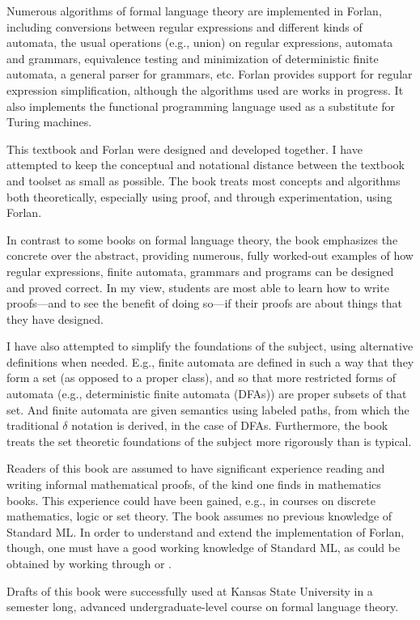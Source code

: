 Numerous algorithms of formal language theory are implemented in
Forlan, including conversions between regular expressions and
different kinds of automata, the usual operations (e.g., union) on
regular expressions, automata and grammars, equivalence testing and
minimization of deterministic finite automata, a general parser for
grammars, etc.  Forlan provides support for regular expression
simplification, although the algorithms used are works in progress.
It also implements the functional programming language used as a
substitute for Turing machines.

This textbook and Forlan were designed and developed together.  I have
attempted to keep the conceptual and notational distance between the
textbook and toolset as small as possible.  The book treats most
concepts and algorithms both theoretically, especially using proof,
and through experimentation, using Forlan.

In contrast to some books on formal language theory, the book
emphasizes the concrete over the abstract, providing numerous, fully
worked-out examples of how regular expressions, finite automata,
grammars and programs can be designed and proved correct.  In my view,
students are most able to learn how to write proofs---and to see the
benefit of doing so---if their proofs are about things that they have
designed.

I have also attempted to simplify the foundations of the subject,
using alternative definitions when needed. E.g., finite automata are
defined in such a way that they form a set (as opposed to a proper
class), and so that more restricted forms of automata (e.g.,
deterministic finite automata (DFAs)) are proper subsets of that
set. And finite automata are given semantics using labeled paths, from
which the traditional $\delta$ notation is derived, in the case of
DFAs. Furthermore, the book treats the set theoretic foundations of
the subject more rigorously than is typical.

Readers of this book are assumed to have significant experience
reading and writing informal mathematical proofs, of the kind one
finds in mathematics books.  This experience could have been gained,
e.g., in courses on discrete mathematics, logic or set theory.  The
book assumes no previous knowledge of Standard ML.  In order to
understand and extend the implementation of Forlan, though, one must
have a good working knowledge of Standard ML, as could be obtained by
working through \cite{Paulson96} or \cite{Ullman98}.

Drafts of this book were successfully used at Kansas State University
in a semester long, advanced undergraduate-level course on formal language
theory.

